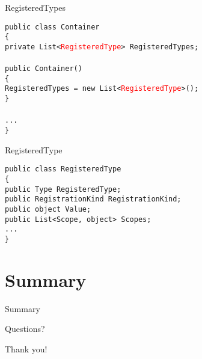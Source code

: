 \documentclass{beamer}
\newcommand{\code}[1]{{\texttt{#1}}}
\begin{document}
\begin{frame}{RegisteredTypes}
     \begin{large}
	\code{public class Container}\\
	\code{\{}\\ \quad
		\code{private List<\textcolor{red}{RegisteredType}> RegisteredTypes;}\\ \quad
		\code{}\\ \quad
		\code{public Container()}\\ \quad
		\code{\{}\\ \qquad
		\code{RegisteredTypes = new List<\textcolor{red}{RegisteredType}>();}\\ \quad
		\code{\}}\\  \quad
		\code{}\\ \quad
		\code{...}\\
	\code{\}}
     \end{large}
\end{frame}

\begin{frame}{RegisteredType}
     \begin{large}
	\code{public class RegisteredType}\\
	\code{\{}\\ \quad
		\code{public Type RegisteredType;}\\ \quad
		\code{public RegistrationKind RegistrationKind;}\\ \quad
		\code{public object Value;}\\ \quad
		\code{public List<Scope, object> Scopes;}\\ \quad
		\code{...}\\
	\code{\}}
     \end{large}
\end{frame}

\section{Summary}

\begin{frame}{}
	\begin{center}
		\Huge{Summary}
	\end{center}
\end{frame}

\begin{frame}{Questions?}
	\begin{center}
		\Huge{Thank you!}
	\end{center}
\end{frame}
\end{document}
